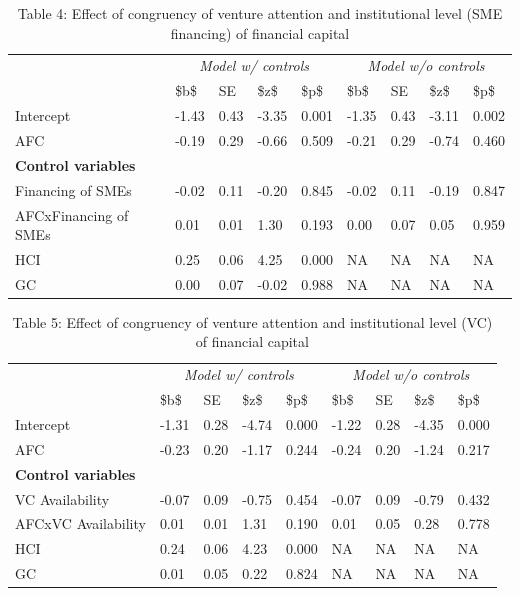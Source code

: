 \documentclass[
  english,
  man]{apa6}
\begin{document}
\begin{table}

\caption{\label{tab:unnamed-chunk-18}Table 4: Effect of congruency of venture attention and institutional level (SME financing) of financial capital}
\centering
\begin{tabular}[t]{l|l|l|l|l|l|l|l|l}
\hline
\multicolumn{1}{c|}{\em{ }} & \multicolumn{4}{c|}{\em{Model w/ controls}} & \multicolumn{4}{c}{\em{Model w/o controls}} \\
\cline{2-5} \cline{6-9}
  & \$b\$ & SE & \$z\$ & \$p\$ & \$b\$ & SE & \$z\$ & \$p\$\\
\hline
Intercept & -1.43 & 0.43 & -3.35 & 0.001 & -1.35 & 0.43 & -3.11 & 0.002\\
\hline
AFC & -0.19 & 0.29 & -0.66 & 0.509 & -0.21 & 0.29 & -0.74 & 0.460\\
\hline
\multicolumn{9}{l}{\textbf{Control variables}}\\
\hline
\hspace{1em}Financing of SMEs & -0.02 & 0.11 & -0.20 & 0.845 & -0.02 & 0.11 & -0.19 & 0.847\\
\hline
\hspace{1em}AFCxFinancing of SMEs & 0.01 & 0.01 & 1.30 & 0.193 & 0.00 & 0.07 & 0.05 & 0.959\\
\hline
HCI & 0.25 & 0.06 & 4.25 & 0.000 & NA & NA & NA & NA\\
\hline
GC & 0.00 & 0.07 & -0.02 & 0.988 & NA & NA & NA & NA\\
\hline
\end{tabular}
\end{table}

\begin{table}

\caption{\label{tab:unnamed-chunk-18}Table 5: Effect of congruency of venture attention and institutional level (VC) of financial capital}
\centering
\begin{tabular}[t]{l|l|l|l|l|l|l|l|l}
\hline
\multicolumn{1}{c|}{\em{ }} & \multicolumn{4}{c|}{\em{Model w/ controls}} & \multicolumn{4}{c}{\em{Model w/o controls}} \\
\cline{2-5} \cline{6-9}
  & \$b\$ & SE & \$z\$ & \$p\$ & \$b\$ & SE & \$z\$ & \$p\$\\
\hline
Intercept & -1.31 & 0.28 & -4.74 & 0.000 & -1.22 & 0.28 & -4.35 & 0.000\\
\hline
AFC & -0.23 & 0.20 & -1.17 & 0.244 & -0.24 & 0.20 & -1.24 & 0.217\\
\hline
\multicolumn{9}{l}{\textbf{Control variables}}\\
\hline
\hspace{1em}VC Availability & -0.07 & 0.09 & -0.75 & 0.454 & -0.07 & 0.09 & -0.79 & 0.432\\
\hline
\hspace{1em}AFCxVC Availability & 0.01 & 0.01 & 1.31 & 0.190 & 0.01 & 0.05 & 0.28 & 0.778\\
\hline
HCI & 0.24 & 0.06 & 4.23 & 0.000 & NA & NA & NA & NA\\
\hline
GC & 0.01 & 0.05 & 0.22 & 0.824 & NA & NA & NA & NA\\
\hline
\end{tabular}
\end{table}
\end{document}
